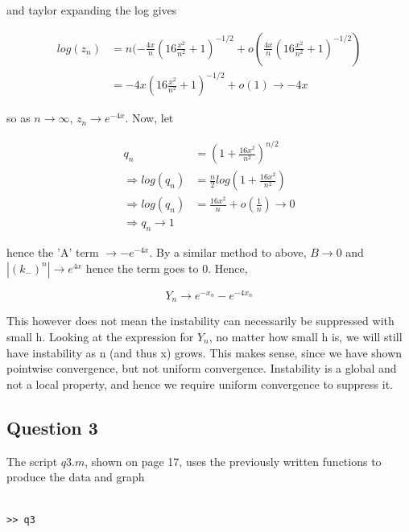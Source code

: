 \documentclass[10pt,a4paper]{report}
\begin{document}
and taylor expanding the log gives

\begin{align*}
log(z_n) &= n(-\frac{4x}{n}(16\frac{x^2}{n^2}+1)^{-1/2}+o(\frac{4x}{n}(16\frac{x^2}{n^2}+1)^{-1/2})\\
&=-4x(16\frac{x^2}{n^2}+1)^{-1/2}+o(1) \rightarrow -4x
\end{align*}

so as $n\rightarrow\infty$, $z_n\rightarrow e^{-4x}$.  Now, let

\begin{align*}
q_n &= (1+\frac{16x^2}{n^2})^{n/2}\\
\Rightarrow log(q_n)&=\frac{n}{2}log(1+\frac{16x^2}{n^2})\\
\Rightarrow log(q_n)&=\frac{16x^2}{n}+o(\frac{1}{n}) \rightarrow 0\\
\Rightarrow q_n \rightarrow 1
\end{align*}

hence the 'A' term $\rightarrow -e^{-4x}$. By a similar method to above, $B\rightarrow 0 $ and $|(k_-)^n| \rightarrow e^{4x}$ hence the term goes to 0. Hence, 

\begin{equation*}
Y_n \rightarrow e^{-x_n} - e^{-4x_n}
\end{equation*}

This however does not mean the instability can necessarily be suppressed with small h. Looking at the expression for $Y_n$, no matter how small h is, we will still have instability as n (and thus x) grows. This makes sense, since we have shown pointwise convergence, but not uniform convergence. Instability is a global and not a local property, and hence we require uniform convergence to suppress it.

\newpage


\subsection*{Question 3}

The script $q3.m$, shown on page 17, uses the previously written functions to produce the data and graph

\begin{verbatim}

>> q3

\end{verbatim}
\end{document}
